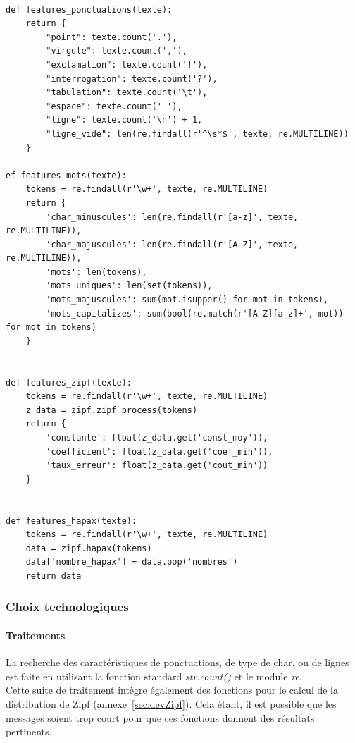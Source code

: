     \begin{lstlisting}[title=Fonctions de la recherche de caractéristiques,label={lst:feat_func}]

def features_ponctuations(texte):
    return {
        "point": texte.count('.'),
        "virgule": texte.count(','),
        "exclamation": texte.count('!'),
        "interrogation": texte.count('?'),
        "tabulation": texte.count('\t'),
        "espace": texte.count(' '),
        "ligne": texte.count('\n') + 1,
        "ligne_vide": len(re.findall(r'^\s*$', texte, re.MULTILINE))
    }

ef features_mots(texte):
    tokens = re.findall(r'\w+', texte, re.MULTILINE)
    return {
        'char_minuscules': len(re.findall(r'[a-z]', texte, re.MULTILINE)),
        'char_majuscules': len(re.findall(r'[A-Z]', texte, re.MULTILINE)),
        'mots': len(tokens),
        'mots_uniques': len(set(tokens)),
        'mots_majuscules': sum(mot.isupper() for mot in tokens),
        'mots_capitalizes': sum(bool(re.match(r'[A-Z][a-z]+', mot)) for mot in tokens)
    }


def features_zipf(texte):
    tokens = re.findall(r'\w+', texte, re.MULTILINE)
    z_data = zipf.zipf_process(tokens)
    return {
        'constante': float(z_data.get('const_moy')),
        'coefficient': float(z_data.get('coef_min')),
        'taux_erreur': float(z_data.get('cout_min'))
    }


def features_hapax(texte):
    tokens = re.findall(r'\w+', texte, re.MULTILINE)
    data = zipf.hapax(tokens)
    data['nombre_hapax'] = data.pop('nombres')
    return data
    \end{lstlisting}

    \subsubsection*{Choix technologiques}
        \paragraph{Traitements}
            La recherche des caractéristiques de ponctuations, de type de char, ou de lignes est faite en utilisant la fonction
            standard \emph{str.count()} et le module \emph{re}.\\

            Cette suite de traitement intègre également des fonctions pour le calcul de la distribution de Zipf (annexe~\ref{sec:devZipf}).
            Cela étant, il est possible que les messages soient trop court pour que ces fonctions donnent des résultats pertinents.\\

